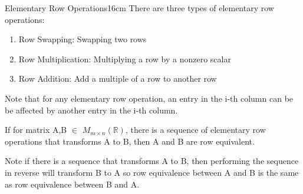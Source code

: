     \begin{definition}{Elementary Row Operations}{16cm}
        There are three types of {\color{lblue} elementary row operations}:

        \begin{enumerate}[label=(\alph*), leftmargin=1cm, itemsep=0.1cm]
            \item {\color{lgreen} Row Swapping}:
                Swapping two rows
    
            \item {\color{lgreen} Row Multiplication}:
                Multiplying a row by a nonzero scalar
    
            \item {\color{lgreen} Row Addition}:
                Add a multiple of a row to another row
        \end{enumerate}

        Note that for any elementary row operation, an entry in the i-th column
        can be be affected by another entry in the i-th column.

        \vspace{0.3cm}

        If for matrix A,B $\in$ $M_{m \times n}(\mathbb{R})$,
        there is a sequence of elementary row operations that
        transforms A to B, then A and B are {\color{lblue} row equivalent}.

        Note if there is a sequence that transforms A to B,
        then performing the sequence in reverse will transform B to A
        so row equivalence between A and B is the same as
        row equivalence between B and A.
    \end{definition}

    \vspace{0.5cm}



